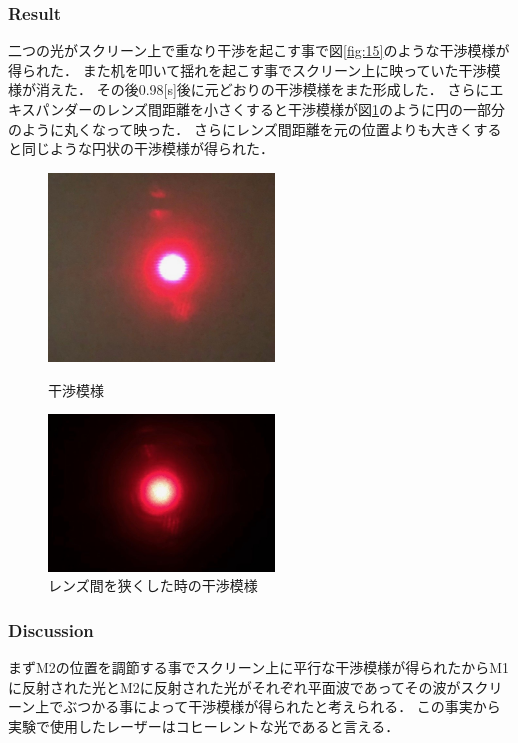 \documentclass[11pt, a4paper]{jsarticle}
\begin{document}
\subsubsection{Result}
二つの光がスクリーン上で重なり干渉を起こす事で図\ref{fig:15}のような干渉模様が得られた．
また机を叩いて揺れを起こす事でスクリーン上に映っていた干渉模様が消えた．
その後0.98[s]後に元どおりの干渉模様をまた形成した．
さらにエキスパンダーのレンズ間距離を小さくすると干渉模様が図\ref{fig:16}のように円の一部分のように丸くなって映った．
さらにレンズ間距離を元の位置よりも大きくすると同じような円状の干渉模様が得られた．

\begin{figure}[htbp]
 \begin{minipage}{0.45\hsize}
  \begin{center}
   \includegraphics[width=60mm]{fig15.png}
  \end{center}
  \caption{干渉模様}
  \label{fig:15}
 \end{minipage}
 \begin{minipage}{0.45\hsize}
  \begin{center}
   \includegraphics[width=60mm]{fig16.png}
  \end{center}
  \caption{レンズ間を狭くした時の干渉模様}
  \label{fig:16}
 \end{minipage}
\end{figure}

\subsubsection{Discussion}
まずM2の位置を調節する事でスクリーン上に平行な干渉模様が得られたからM1に反射された光とM2に反射された光がそれぞれ平面波であってその波がスクリーン上でぶつかる事によって干渉模様が得られたと考えられる．
この事実から実験で使用したレーザーはコヒーレントな光であると言える．
\end{document}

